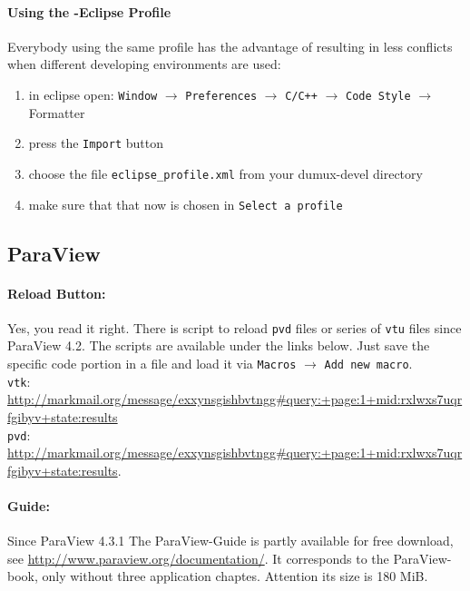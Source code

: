 \paragraph{Using the \Dumux-Eclipse Profile}
Everybody using the same profile has the advantage of resulting in less conflicts
when different developing environments are used:
\begin{enumerate}
  \item in eclipse open: \texttt{Window} $\rightarrow$ \texttt{Preferences} $\rightarrow$ \texttt{C/C++}  $\rightarrow$ \texttt{Code Style} $\rightarrow$ Formatter
  \item press the \texttt{Import} button
  \item choose the file \texttt{eclipse\_profile.xml} from your dumux-devel directory
  \item make sure that that now \Dumux is chosen in \texttt{Select a profile}
\end{enumerate}


\subsection{ParaView}
\paragraph{Reload Button:}
Yes, you read it right. There is script to reload \texttt{pvd} files or
series of \texttt{vtu} files since ParaView 4.2. The scripts are available
under the links below. Just save the specific code portion in a file and load
it via \texttt{Macros} $\rightarrow$ \texttt{Add new macro}.\\
\texttt{vtk}: \url{http://markmail.org/message/exxynsgishbvtngg#query:+page:1+mid:rxlwxs7uqrfgibyv+state:results}\\
\texttt{pvd}: \url{http://markmail.org/message/exxynsgishbvtngg#query:+page:1+mid:rxlwxs7uqrfgibyv+state:results}.

\paragraph{Guide:}
Since ParaView 4.3.1 The ParaView-Guide is partly
available for free download, see \url{http://www.paraview.org/documentation/}.
It corresponds to the ParaView-book, only without three application chaptes.
Attention its size is 180 MiB.
